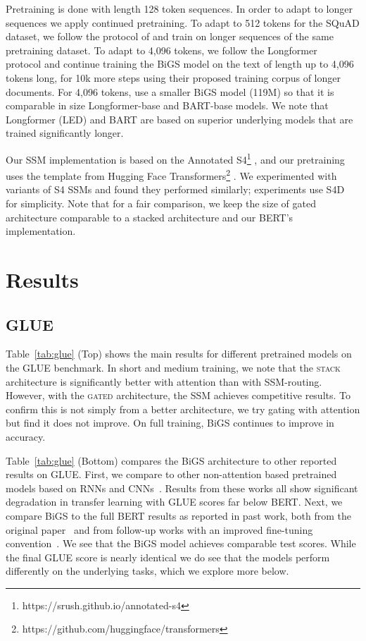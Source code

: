 Pretraining is done with length 128 token sequences. In order to adapt to longer sequences we apply continued pretraining. To adapt to 512 tokens for the SQuAD dataset, we follow the protocol of \citet{wettig2022should} and train on longer sequences of the same pretraining dataset.  To adapt to 4,096 tokens, we follow the Longformer~\cite{beltagy2020longformer} protocol and continue training the BiGS model on the text of length up to 4,096 tokens long, for 10k more steps using their proposed training corpus of longer documents. For 4,096 tokens, use a smaller BiGS model (119M) so that it is comparable in size Longformer-base and BART-base models. We note that Longformer (LED) and BART are based on superior underlying models that are trained significantly longer.

Our SSM implementation is based on the Annotated S4\footnote{https://srush.github.io/annotated-s4} \citep{rush2022s4}, and our pretraining uses the template from Hugging Face Transformers\footnote{https://github.com/huggingface/transformers} \citep{wolf2020transformers}. We experimented with variants of S4 SSMs and found they performed similarly; experiments use S4D~\cite{gu2022parameterization} for simplicity. Note that for a fair comparison, we keep the size of gated architecture comparable to a stacked architecture and our BERT's implementation. 

\section{Results}

\subsection{GLUE}

Table~\ref{tab:glue} (Top) shows the main results for different pretrained models on the GLUE benchmark. In short and medium training, we note that the \textsc{stack} architecture is significantly better with attention than with SSM-routing. However, with the \textsc{gated} architecture, the SSM achieves competitive results. To confirm this is not simply from a better architecture, we try gating with attention but find it does not improve. On full training, BiGS continues to improve in accuracy.

Table~\ref{tab:glue} (Bottom) compares the BiGS architecture to other reported results on GLUE. First, we compare to other non-attention based pretrained models based on RNNs and CNNs~\citep{peters2019tune,tay2021pre,lee2021fnet}. Results from these works all show significant degradation in transfer learning with GLUE scores far below BERT. Next, we compare BiGS to the full BERT results as reported in past work, both from the original paper~\citep{devlin2018bert} and from follow-up works with an improved fine-tuning convention~\citep{izsak2021train}. We see that the  BiGS model achieves comparable test scores. While the final GLUE score is nearly identical we do see that the models perform differently on the underlying tasks, which we explore more below.

